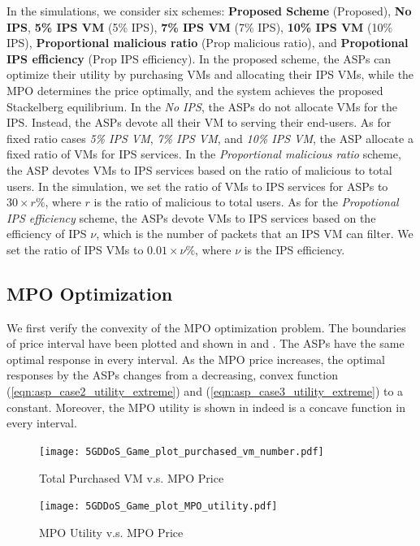 \documentclass[10pt,journal, compsoc]{IEEEtran}
\begin{document}
In the simulations, we consider six schemes: \textbf{Proposed Scheme} (Proposed), \textbf{No IPS}, \textbf{5\% IPS VM} (5\% IPS), \textbf{7\% IPS VM} (7\% IPS), \textbf{10\% IPS VM} (10\% IPS), \textbf{Proportional malicious ratio} (Prop malicious ratio), and \textbf{Propotional IPS efficiency} (Prop IPS efficiency). In the proposed scheme, the ASPs can optimize their utility by purchasing VMs and allocating their IPS VMs, while the MPO determines the price optimally, and the system achieves the proposed Stackelberg equilibrium. In the \textit{No IPS}, the ASPs do not allocate VMs for the IPS. Instead, the ASPs devote all their VM to serving their end-users. As for fixed ratio cases \textit{5\% IPS VM}, \textit{7\% IPS VM}, and \textit{10\% IPS VM}, the ASP allocate a fixed ratio of VMs for IPS services. In the \textit{Proportional malicious ratio} scheme, the ASP devotes VMs to IPS services based on the ratio of malicious to total users. In the simulation, we set the ratio of VMs to IPS services for ASPs to $30 \times r \%$, where $r$ is the ratio of malicious to total users. As for the \textit{Propotional IPS efficiency} scheme, the ASPs devote VMs to IPS services based on the efficiency of IPS $\nu$, which is the number of packets that an IPS VM can filter. We set the ratio of IPS VMs to $0.01 \times \nu \%$, where $\nu$ is the IPS efficiency.

\subsection{MPO Optimization}\label{MPO_opti}
We first verify the convexity of the MPO optimization problem. The boundaries of price interval have been plotted and shown in  and . The ASPs have the same optimal response in every interval. As the MPO price increases, the optimal responses by the ASPs changes from a decreasing, convex function (\ref{eqn:asp_case2_utility_extreme}) and (\ref{eqn:asp_case3_utility_extreme}) to a constant. Moreover, the MPO utility is shown in  indeed is a concave function in every interval. 
\begin{figure}
    \begin{minipage}{0.45\linewidth}
        \centering
        \texttt{[image: 5GDDoS\_Game\_plot\_purchased\_vm\_number.pdf]}
        \caption{Total Purchased VM v.s. MPO Price}
        \label{fig:VMnum}
    \end{minipage}
    \begin{minipage}{0.45\linewidth}
        \centering
        \texttt{[image: 5GDDoS\_Game\_plot\_MPO\_utility.pdf]}
        \caption{MPO Utility v.s. MPO Price}
        \label{fig:MPOutil}
    \end{minipage}
\end{figure}
\end{document}
